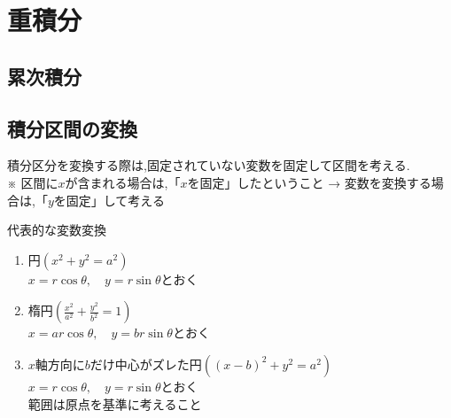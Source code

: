 \documentclass[a4paper]{jsarticle}
\begin{document}
\section{重積分}
\subsection{累次積分}
\subsection{積分区間の変換}
積分区分を変換する際は,固定されていない変数を固定して区間を考える.\\
※ 区間に$x$が含まれる場合は,「$x$を固定」したということ → 変数を変換する場合は,「$y$を固定」して考える
\begin{itembox}[l]{代表的な変数変換}
    \begin{enumerate}[(1)]
        \item 円\quad $\left(x^2+y^2=a^2\right)$\\
              $x=r\cos\theta,\quad y=r\sin\theta$とおく
        \item 楕円\quad $\left(\frac{x^2}{a^2}+\frac{y^2}{b^2}=1\right)$\\
              $x=ar\cos\theta,\quad y=br\sin\theta$とおく
        \item $x$軸方向に$b$だけ中心がズレた円\quad $\left(\left(x-b\right)^2+y^2=a^2\right)$\\
              $x=r\cos\theta,\quad y=r\sin\theta$とおく\\
              範囲は原点を基準に考えること
    \end{enumerate}
\end{itembox}
\end{document}
